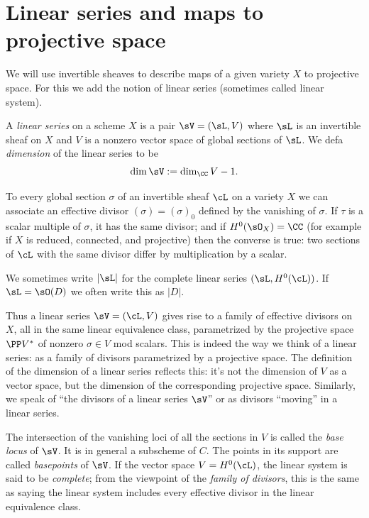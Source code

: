\section{Linear series and maps to projective space}

We will use invertible sheaves to  describe maps of a given variety $X$ to projective space. For this we add the notion of linear series (sometimes called linear system). 
%
%

\begin{definition}
 A \emph{linear series} on a scheme $X$ is a pair $\sV  = (\sL, V)$ where $\sL$ is an invertible sheaf  on $X$ and
 $V$ is a nonzero vector space of global sections of $\sL$. We defa 
\emph{dimension}
%
of the linear series to be  
 $$
 \dim \sV := \dim_\CC V -1.
 $$
  \end{definition}
  
To every global section $\sigma$ of an invertible sheaf $\cL$ on a variety $X$  we can associate an effective divisor $(\sigma) = (\sigma)_0$ defined by the vanishing of $\sigma$. If $\tau$ is a scalar multiple of $\sigma$, it has the same divisor; and if 
 $H^0(\sO_X) = \CC$ (for example if $X$ is reduced, connected, and
 projective) then the converse is true: two sections of $\cL$ with the same divisor differ by multiplication by a scalar.  
 
 We sometimes write
 $|\sL|$ for the complete linear series $(\sL, H^0(\cL))$. If 
$\sL = \sO(D)$
%
 we often write this as $|D|$.

Thus a linear series $\sV = (\cL, V)$ gives rise to a family of
effective divisors on $X$, all in the same linear equivalence class,
parametrized by the projective space $\PP V^*$ 
of nonzero $\sigma \in V$ mod scalars.
This is indeed the way 
we think of a linear series: as a family of divisors parametrized by a
projective space.
The definition of the dimension
of a linear series 
reflects this: 
it's not the dimension of $V$ as a vector
space, but the dimension of the corresponding projective space. 
Similarly, we speak
 of ``the divisors of
a linear series $\sV$'' or as divisors ``moving'' in a linear series.

The intersection of the vanishing loci of all the sections in $V$ is
%
called the \emph{base locus} of $\sV$. It is in general a subscheme of
$C$. The points in its support are called \emph{basepoints} of $\sV$.
If the vector space $V = H^0(\cL)$, the linear system is said to be
%
\emph{complete}; 
from the viewpoint
of the \emph{family of divisors},
%
this is the same as saying the linear system includes every
effective divisor in the linear equivalence class. 
 
